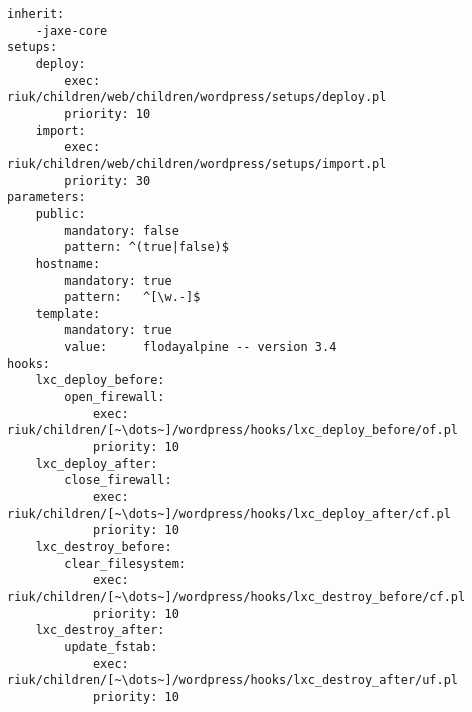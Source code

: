 \begin{lstlisting}[float=t, caption={config.yml}, label=fig_1.3_config]
inherit:
	-jaxe-core
setups:
	deploy:
		exec:     riuk/children/web/children/wordpress/setups/deploy.pl
		priority: 10
	import:
		exec:     riuk/children/web/children/wordpress/setups/import.pl
		priority: 30
parameters:
	public:
		mandatory: false
		pattern: ^(true|false)$
	hostname:
		mandatory: true
		pattern:   ^[\w.-]$
	template:
		mandatory: true
		value:     flodayalpine -- version 3.4
hooks:
	lxc_deploy_before:
		open_firewall:
			exec:     riuk/children/[~\dots~]/wordpress/hooks/lxc_deploy_before/of.pl
			priority: 10
	lxc_deploy_after:
		close_firewall:
			exec:     riuk/children/[~\dots~]/wordpress/hooks/lxc_deploy_after/cf.pl
			priority: 10
	lxc_destroy_before:
		clear_filesystem:
			exec:     riuk/children/[~\dots~]/wordpress/hooks/lxc_destroy_before/cf.pl
			priority: 10
	lxc_destroy_after:
		update_fstab:
			exec:     riuk/children/[~\dots~]/wordpress/hooks/lxc_destroy_after/uf.pl
			priority: 10
\end{lstlisting}
